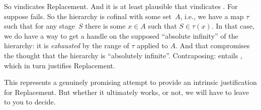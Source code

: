 \documentclass[../../../include/open-logic-section]{subfiles}
\begin{document}
So \stagescofin{} vindicates Replacement. And it is at least plausible
that \stagesinex{} vindicates \stagescofin. For suppose \stagescofin{}
fails. So the hierarchy is cofinal with some set~$A$, i.e., we have a
map $\tau$ such that for any stage~$S$ there is some $x \in A$ such
that $S \in \tau(x)$. In that case, we do have a way to get a handle
on the supposed ``absolute infinity'' of the hierarchy: it is
\emph{exhausted} by the range of $\tau$ applied to $A$. And that
compromises the thought that the hierarchy is ``absolutely infinite''.
Contraposing: \stagesinex{} entails \stagescofin, which in turn
justifies Replacement.

This represents a genuinely promising attempt to provide an
intrinsic justification for Replacement. But whether it ultimately
works, or not, we will have to leave to you to decide.
\end{document}
